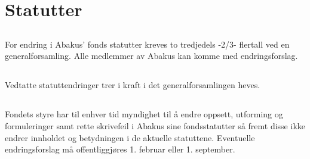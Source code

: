 \section{Statutter}

\subsection{}
For endring i Abakus’ fonds statutter kreves to tredjedels -2/3- flertall ved en
generalforsamling. Alle medlemmer av Abakus kan komme med endringsforslag.

\subsection{}
Vedtatte statuttendringer trer i kraft i det generalforsamlingen heves.

\subsection{}
Fondets styre har til enhver tid myndighet til å endre oppsett, utforming og formuleringer samt rette skrivefeil i Abakus sine fondsstatutter så fremt disse ikke endrer innholdet og betydningen i de aktuelle statuttene. Eventuelle endringsforslag må offentliggjøres 1. februar eller 1. september.
